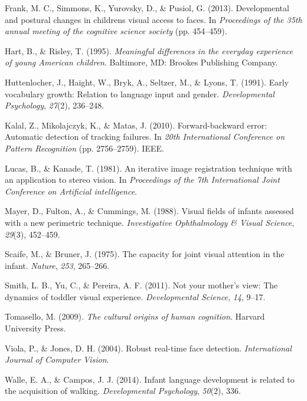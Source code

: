 \documentclass[a4paper,man,apacite,floatsintext,longtable]{apa6}
\begin{document}
\hypertarget{ref-frank2013}{}
Frank, M. C., Simmons, K., Yurovsky, D., \& Pusiol, G. (2013).
Developmental and postural changes in childrens visual access to faces.
In \emph{Proceedings of the 35th annual meeting of the cognitive science
society} (pp. 454--459).

\hypertarget{ref-hart1995}{}
Hart, B., \& Risley, T. (1995). \emph{Meaningful differences in the
everyday experience of young American children}. Baltimore, MD: Brookes
Publishing Company.

\hypertarget{ref-huttenlocher1991}{}
Huttenlocher, J., Haight, W., Bryk, A., Seltzer, M., \& Lyons, T.
(1991). Early vocabulary growth: Relation to language input and gender.
\emph{Developmental Psychology}, \emph{27}(2), 236--248.

\hypertarget{ref-kalal2010}{}
Kalal, Z., Mikolajczyk, K., \& Matas, J. (2010). Forward-backward error:
Automatic detection of tracking failures. In \emph{20th International
Conference on Pattern Recognition} (pp. 2756--2759). IEEE.

\hypertarget{ref-lucas1981}{}
Lucas, B., \& Kanade, T. (1981). An iterative image registration
technique with an application to stereo vision. In \emph{Proceedings of
the 7th International Joint Conference on Artificial intelligence}.

\hypertarget{ref-mayer1988}{}
Mayer, D., Fulton, A., \& Cummings, M. (1988). Visual fields of infants
assessed with a new perimetric technique. \emph{Investigative
Ophthalmology \& Visual Science}, \emph{29}(3), 452--459.

\hypertarget{ref-scaife1975}{}
Scaife, M., \& Bruner, J. (1975). The capacity for joint visual
attention in the infant. \emph{Nature}, \emph{253}, 265--266.

\hypertarget{ref-smith2011}{}
Smith, L. B., Yu, C., \& Pereira, A. F. (2011). Not your mother's view:
The dynamics of toddler visual experience. \emph{Developmental Science},
\emph{14}, 9--17.

\hypertarget{ref-tomasello2009}{}
Tomasello, M. (2009). \emph{The cultural origins of human cognition}.
Harvard University Press.

\hypertarget{ref-viola2004}{}
Viola, P., \& Jones, D. H. (2004). Robust real-time face detection.
\emph{International Journal of Computer Vision}.

\hypertarget{ref-walle2014}{}
Walle, E. A., \& Campos, J. J. (2014). Infant language development is
related to the acquisition of walking. \emph{Developmental Psychology},
\emph{50}(2), 336.
\end{document}
